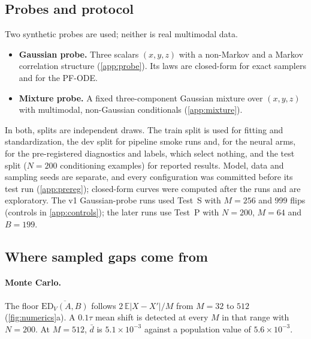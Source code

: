 \documentclass{article}
\theoremstyle{plain}
\theoremstyle{definition}
\theoremstyle{remark}
\newcommand{\ED}{\mathrm{ED}}
\newcommand{\E}{\mathbb{E}}
\begin{document}
\subsection{Probes and protocol}
\label{sec:exp-protocol}
Two synthetic probes are used; neither is real multimodal data.
\begin{itemize}
\item \textbf{Gaussian probe.} Three scalars $(x,y,z)$ with a non-Markov and a Markov correlation structure (\cref{app:probe}). Its laws are closed-form for exact samplers and for the PF-ODE.
\item \textbf{Mixture probe.} A fixed three-component Gaussian mixture over $(x,y,z)$ with multimodal, non-Gaussian conditionals (\cref{app:mixture}).
\end{itemize}
In both, splits are independent draws. The train split is used for fitting and standardization, the dev split for pipeline smoke runs and, for the neural arms, for the pre-registered diagnostics and labels, which select nothing, and the test split ($N=200$ conditioning examples) for reported results.
Model, data and sampling seeds are separate, and every configuration was committed before its test run (\cref{app:prereg}); closed-form curves were computed after the runs and are exploratory.
The v1 Gaussian-probe runs used Test~S with $M=256$ and 999 flips (controls in \cref{app:controls}); the later runs use Test~P with $N=200$, $M=64$ and $B=199$.



\subsection{Where sampled gaps come from}
\label{sec:exp-numerics}


\paragraph{Monte Carlo.}
The floor $\overline{\ED_V(A,B)}$ follows $2\,\E|X-X'|/M$ from $M=32$ to $512$ (\cref{fig:numerics}a).
A $0.1\tau$ mean shift is detected at every $M$ in that range with $N=200$. At $M=512$, $\bar d$ is $5.1\times10^{-3}$ against a population value of $5.6\times10^{-3}$.
\end{document}
